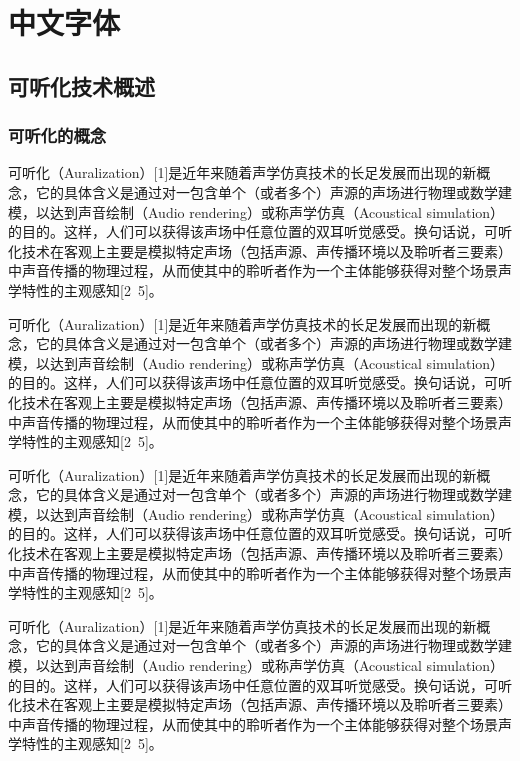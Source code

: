 \documentclass[a4paper,fontset=none]{ctexbook}
\newcommand{\sXiaosi}{\fontsize{12pt}{14.4pt}\selectfont}               %
\renewcommand{\baselinestretch}{1.25}           %
\begin{document}
\renewcommand{\baselinestretch}{1.25}
\sXiaosi\songti

\chapter{中文字体}
\section{可听化技术概述}

\subsection{可听化的概念}





可听化（Auralization）[1]是近年来随着声学仿真技术的长足发展而出现的新概念，它的具体含义是通过对一包含单个（或者多个）声源的声场进行物理或数学建模，以达到声音绘制（Audio rendering）或称声学仿真（Acoustical simulation）的目的。这样，人们可以获得该声场中任意位置的双耳听觉感受。换句话说，可听化技术在客观上主要是模拟特定声场（包括声源、声传播环境以及聆听者三要素）中声音传播的物理过程，从而使其中的聆听者作为一个主体能够获得对整个场景声学特性的主观感知[2~5]。

可听化（Auralization）[1]是近年来随着声学仿真技术的长足发展而出现的新概念，它的具体含义是通过对一包含单个（或者多个）声源的声场进行物理或数学建模，以达到声音绘制（Audio rendering）或称声学仿真（Acoustical simulation）的目的。这样，人们可以获得该声场中任意位置的双耳听觉感受。换句话说，可听化技术在客观上主要是模拟特定声场（包括声源、声传播环境以及聆听者三要素）中声音传播的物理过程，从而使其中的聆听者作为一个主体能够获得对整个场景声学特性的主观感知[2~5]。

可听化（Auralization）[1]是近年来随着声学仿真技术的长足发展而出现的新概念，它的具体含义是通过对一包含单个（或者多个）声源的声场进行物理或数学建模，以达到声音绘制（Audio rendering）或称声学仿真（Acoustical simulation）的目的。这样，人们可以获得该声场中任意位置的双耳听觉感受。换句话说，可听化技术在客观上主要是模拟特定声场（包括声源、声传播环境以及聆听者三要素）中声音传播的物理过程，从而使其中的聆听者作为一个主体能够获得对整个场景声学特性的主观感知[2~5]。

可听化（Auralization）[1]是近年来随着声学仿真技术的长足发展而出现的新概念，它的具体含义是通过对一包含单个（或者多个）声源的声场进行物理或数学建模，以达到声音绘制（Audio rendering）或称声学仿真（Acoustical simulation）的目的。这样，人们可以获得该声场中任意位置的双耳听觉感受。换句话说，可听化技术在客观上主要是模拟特定声场（包括声源、声传播环境以及聆听者三要素）中声音传播的物理过程，从而使其中的聆听者作为一个主体能够获得对整个场景声学特性的主观感知[2~5]。
\end{document}
